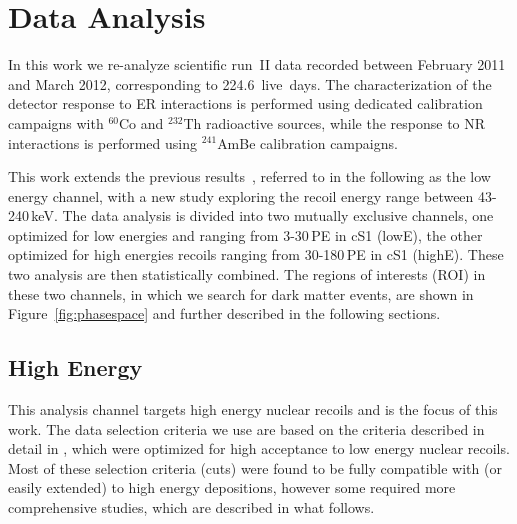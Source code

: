 \section{Data Analysis}
\label{sec:Analysis}
In this work we re-analyze scientific run~II data recorded between February 2011 and March 2012, 
corresponding to 224.6~live~days. The characterization of the detector response to ER interactions is performed using dedicated calibration campaigns with $^{60}$Co and $^{232}$Th radioactive sources, while the response to NR interactions is performed using $^{241}$AmBe calibration campaigns.

 
This work extends the previous results~\cite{xe100_run10_si,xe100_run_combination}, referred to in the following as the low energy channel, with a new study exploring the recoil energy range between 43-240\,keV. 
The data analysis is divided into two mutually exclusive channels, one optimized for low energies and ranging from 3-30\,PE in cS1 (lowE), 
the other optimized for high energies recoils ranging from 30-180\,PE in cS1 (highE).  These two analysis are then statistically combined. 
The regions of interests (ROI) in these two channels, in which we search for dark matter events, are shown in Figure~\ref{fig:phasespace} and further described in the following sections. 



\subsection{High Energy}
\label{subsubsec:HighE}
This analysis channel targets high energy nuclear recoils and is the focus of this work. The data selection criteria we use are based on the criteria described in detail in \cite{Aprile:2012vw}, which were optimized for high 
acceptance to low energy nuclear recoils.
Most of these selection criteria (cuts) were found to be fully compatible with (or easily extended) to high energy depositions, however some required more comprehensive studies, which are described in what follows. 

